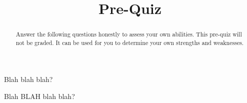 \documentclass{ximera}
\title{Pre-Quiz}
\begin{document}
\begin{abstract}
Answer the following questions honestly to assess your own abilities. This pre-quiz will not be graded. It can be used for you to determine your own strengths and weaknesses.
\end{abstract}
\maketitle

\begin{problem}{}

\begin{problem}

Blah blah blah?

\begin{multipleChoice}


\end{multipleChoice}

\end{problem}

\begin{problem}

Blah BLAH blah blah?

\begin{multipleChoice}


\end{multipleChoice}

\end{problem}

\end{problem}

\end{document}
